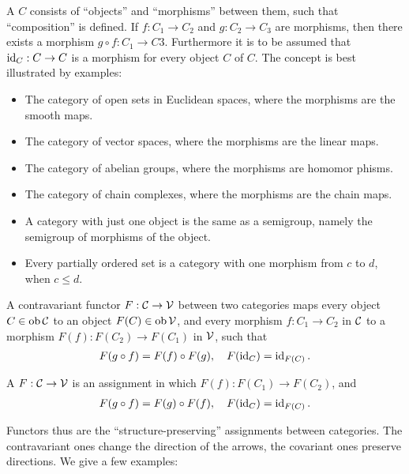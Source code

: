 A  $C$ consists of ``objects'' and ``morphisms'' between them, such that
``composition'' is defined. If $f:C_1\to C_2$ and $g:C_2\to C_3$ are morphisms, then
there exists a morphism $g\circ f: C_1\to C3$. Furthermore it is to be assumed that
$\operatorname{id}_C: C\to C$ is a morphism for every object $C$ of $C$. The concept is best illustrated
by examples:

\begin{itemize}
  \item The category of open sets in Euclidean spaces, where the morphisms are
        the smooth maps.
  \item The category of vector spaces, where the morphisms are the linear maps.
  \item The category of abelian groups, where the morphisms are homomor phisms.
  \item The category of chain complexes, where the morphisms are the chain maps.
  \item A category with just one object is the same as a semigroup, namely the semigroup of morphisms of the object.
  \item Every partially ordered set is a category with one morphism from $c$ to $d$, when $c\le d$.
\end{itemize}

A contravariant functor $F:\mathcal{C}\to \mathcal{V}$ between two categories maps every object
$C\in\operatorname{ob}\mathcal{C}$ to an object $F(C)\in\operatorname{ob}\mathcal{V}$, and every morphism $f:C_1\to C_2$ in $\mathcal{C}$ to
a morphism $F(f):F(C_2)\to F(C_1)$ in $\mathcal{V}$, such that
\begin{align*}
  F(g\circ f)=F(f)\circ F(g),\quad F(\operatorname{id}_C)=\operatorname{id}_{F(C)}.
\end{align*}

A  $F:\mathcal{C}\to\mathcal{V}$ is an assignment in which $F(f):F(C_1)\to F(C_2)$, and
\begin{align*}
  F(g\circ f)=F(g)\circ F(f),\quad F(\operatorname{id}_C)=\operatorname{id}_{F(C)}.
\end{align*}

Functors thus are the ``structure-preserving'' assignments between categories. The
contravariant ones change the direction of the arrows, the covariant ones preserve
directions. We give a few examples:

